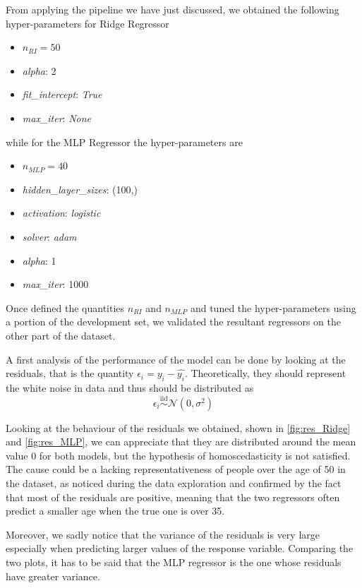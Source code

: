 From applying the pipeline we have just discussed, we obtained the following hyper-parameters for Ridge Regressor
\begin{itemize}
    \item $n_{RI} = 50$
    \item \textit{alpha}: 2
    \item \textit{fit\_intercept}: \textit{True}
    \item \textit{max\_iter}: \textit{None}
\end{itemize}
while for the MLP Regressor the hyper-parameters are
\begin{itemize}
    \item $n_{MLP} = 40$
    \item \textit{hidden\_layer\_sizes}: (100,)
    \item \textit{activation}: \textit{logistic}
    \item \textit{solver}: \textit{adam}
    \item \textit{alpha}: 1
    \item \textit{max\_iter}: 1000
\end{itemize}


Once defined the quantities $n_{RI}$ and $n_{MLP}$ and tuned the hyper-parameters using a portion of the development set, we validated the resultant regressors on the other part of the dataset.

A first analysis of the performance of the model can be done by looking at the residuals, that is the quantity $\epsilon_i = y_i - \hat{y_i}$. 
Theoretically, they should represent the white noise in data and thus should be distributed as
$$\epsilon_i \overset{\text{iid}}{\sim} \mathcal{N}(0, \sigma^2)$$

Looking at the behaviour of the residuals we obtained, shown in \eqref{fig:res_Ridge} and \eqref{fig:res_MLP}, we can appreciate that they are distributed around the mean value 0 for both models, but the hypothesis of homoscedasticity is not satisfied. The cause could be a lacking representativeness of people over the age of 50 in the dataset, as noticed during the data exploration and confirmed by the fact that most of the residuals are positive, meaning that the two regressors often predict a smaller age when the true one is over 35.

Moreover, we sadly notice that the variance of the residuals is very large especially when predicting larger values of the response variable. Comparing the two plots, it has to be said that the MLP regressor is the one whose residuals have greater variance.

